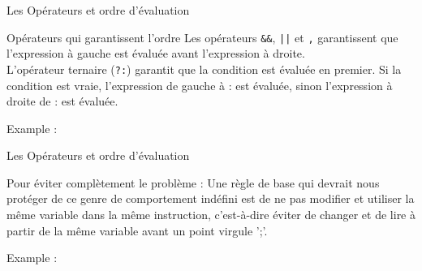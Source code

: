 \documentclass{beamer}
\begin{document}
\begin{darkframes}

    \begin{frame}{Les Opérateurs et ordre d'évaluation}
	  	\begin{alertblock}{Opérateurs qui garantissent l'ordre}
	  		Les opérateurs \texttt{\alert{\&\&}}, \texttt{\alert{||}} et \texttt{\alert{,}} garantissent que l'expression à gauche est évaluée avant l'expression à droite.\\
	  		L'opérateur ternaire (\texttt{\alert{?:}}) garantit que la condition est évaluée en premier. Si la condition est vraie, l'expression de gauche à \alert{:} est évaluée, sinon l'expression à droite de \alert{:} est évaluée.
	  	\end{alertblock}
  		\begin{exampleblock}{Example :}
  			\opNoUB
  		\end{exampleblock}
  	\end{frame}

	\begin{frame}{Les Opérateurs et ordre d'évaluation}
		\begin{alertblock}{Pour éviter complètement le problème :}
			Une règle de base qui devrait nous protéger de ce genre de comportement indéfini est de ne pas modifier et utiliser la même variable dans la même instruction, c'est-à-dire éviter de changer et de lire à partir de la même variable avant un \alert{point virgule ';'}.
		\end{alertblock}
		\begin{exampleblock}{Example :}
			\opNoUB
		\end{exampleblock}
	\end{frame}
   	

\end{darkframes}
\end{document}
